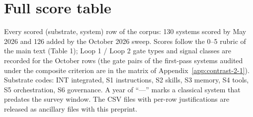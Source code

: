 \documentclass[
  11pt,
]{article}
\begin{document}
\section{Full score table}\label{app:scores}

Every scored (substrate, system) row of the corpus: 130 systems scored by May 2026 and 126 added by the October 2026 sweep. Scores follow the 0--5 rubric of the main text (Table 1); Loop 1 / Loop 2 gate types and signal classes are recorded for the October rows (the gate pairs of the first-pass systems audited under the composite criterion are in the matrix of Appendix~\ref{app:contrast-2-1}). Substrate codes: INT integrated, S1 instructions, S2 skills, S3 memory, S4 tools, S5 orchestration, S6 governance. A year of ``---'' marks a classical system that predates the survey window. The CSV files with per-row justifications are released as ancillary files with this preprint.

\begingroup\scriptsize
\end{document}
